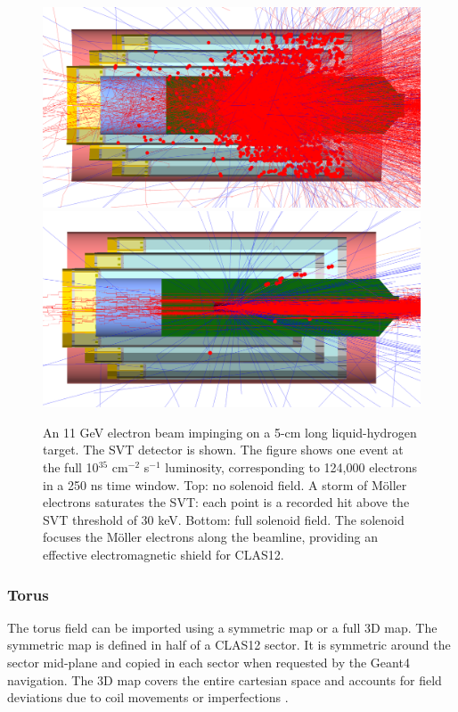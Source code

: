 \begin{figure}
	\centering
	\includegraphics[width=0.98\columnwidth,keepaspectratio]{img/solenoidOFF.png}
	\includegraphics[width=0.98\columnwidth,keepaspectratio]{img/solenoidON.png}
    \caption{An 11 GeV electron beam impinging on a 5-cm long liquid-hydrogen target. The SVT detector is shown.
             The figure shows one event at the full 10$^{35}$ cm$^{-2}$ s$^{-1}$ luminosity, corresponding to 124,000 electrons in a 250 ns time window.
			 Top: no solenoid field. A storm of M\"oller electrons saturates the SVT: each point is a recorded hit above the SVT threshold of 30 keV.
			 Bottom: full solenoid field.
             The solenoid focuses the M\"oller electrons along the beamline, providing an effective electromagnetic shield for CLAS12. }
	\label{fig:solenoidONOFF}
\end{figure}

\subsubsection{Torus}
The torus field can be imported using a symmetric map or a full 3D map.
The symmetric map is defined in half of a CLAS12 sector. It is symmetric around the sector mid-plane and copied in each sector
when requested by the Geant4 navigation. The 3D map covers the entire cartesian space and accounts for field deviations due to coil
movements or imperfections \cite{GhoshalSolenoid}.

